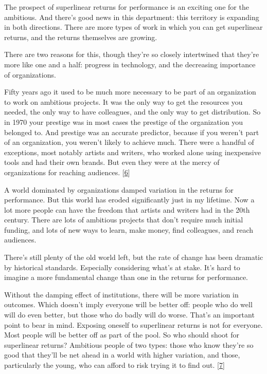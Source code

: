 The prospect of superlinear returns for performance is an exciting one
for the ambitious. And there's good news in this department: this
territory is expanding in both directions. There are more types of work
in which you can get superlinear returns, and the returns themselves are
growing.

There are two reasons for this, though they're so closely intertwined
that they're more like one and a half: progress in technology, and the
decreasing importance of organizations.

Fifty years ago it used to be much more necessary to be part of an
organization to work on ambitious projects. It was the only way to get
the resources you needed, the only way to have colleagues, and the only
way to get distribution. So in 1970 your prestige was in most cases the
prestige of the organization you belonged to. And prestige was an
accurate predictor, because if you weren't part of an organization, you
weren't likely to achieve much. There were a handful of exceptions, most
notably artists and writers, who worked alone using inexpensive tools
and had their own brands. But even they were at the mercy of
organizations for reaching audiences. {[}\hyperref[f6n]{6}{]}

A world dominated by organizations damped variation in the returns for
performance. But this world has eroded significantly just in my
lifetime. Now a lot more people can have the freedom that artists and
writers had in the 20th century. There are lots of ambitious projects
that don't require much initial funding, and lots of new ways to learn,
make money, find colleagues, and reach audiences.

There's still plenty of the old world left, but the rate of change has
been dramatic by historical standards. Especially considering what's at
stake. It's hard to imagine a more fundamental change than one in the
returns for performance.

Without the damping effect of institutions, there will be more variation
in outcomes. Which doesn't imply everyone will be better off: people who
do well will do even better, but those who do badly will do worse.
That's an important point to bear in mind. Exposing oneself to
superlinear returns is not for everyone. Most people will be better off
as part of the pool. So who should shoot for superlinear returns?
Ambitious people of two types: those who know they're so good that
they'll be net ahead in a world with higher variation, and those,
particularly the young, who can afford to risk trying it to find out.
{[}\hyperref[f7n]{7}{]}

